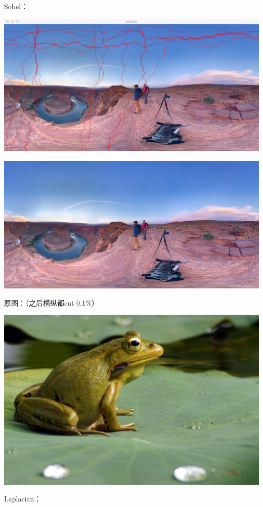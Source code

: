 \documentclass[10pt, a4paper]{article}
\begin{document}
    Sobel：

    \includegraphics[scale = .3]{5sobelseam.png}

    \includegraphics[scale = .3]{5sobel.jpg}

    原图：（之后横纵都cut 0.1$\%$）

    \includegraphics[scale = .1]{6.jpg}

    Laplacian：
\end{document}
